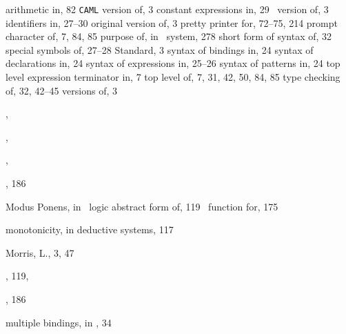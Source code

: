 \begin{theindex}
  \item \ML
    \subitem arithmetic in, 82
    \subitem \verb+CAML+ version of, 3
    \subitem constant expressions in, 29
    \subitem \HOL\ version of, 3
    \subitem identifiers in, 27--30
    \subitem original version of, 3
    \subitem pretty printer for, 72--75, 214
    \subitem prompt character of, 7, 84, 85
    \subitem purpose of, in \HOL\ system, 278
    \subitem short form of syntax of, 32
    \subitem special symbols of, 27--28
    \subitem Standard, 3
    \subitem syntax of bindings in, 24
    \subitem syntax of declarations in, 24
    \subitem syntax of expressions in, 25--26
    \subitem syntax of patterns in, 24
    \subitem top level expression terminator in, 7
    \subitem top level of, 7, 31, 42, 50, 84, 85
    \subitem type checking of, 32, 42--45
    \subitem versions of, 3
  \item {}, 
  \item \ML{}, 
  \item {}, 
  \item {}, 186
  \item Modus Ponens, in \HOL\ logic
    \subitem abstract form of, 119
    \subitem \ML\ function for, 175
  \item monotonicity, in deductive systems, 117
  \item Morris, L., 3, 47
  \item {}, 119, 
  \item {}, 186
  \item multiple bindings, in \ML, 34

  \indexspace


\end{theindex}
